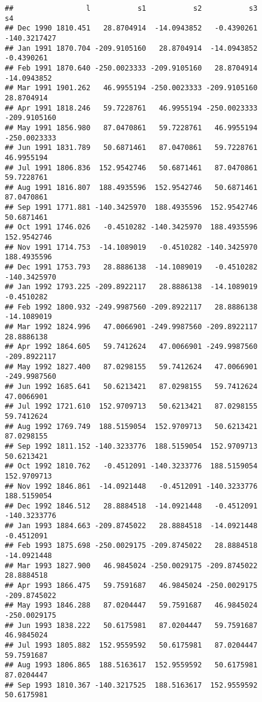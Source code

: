 \documentclass[]{article}
\begin{document}
\begin{verbatim}
##                 l           s1           s2           s3           s4
## Dec 1990 1810.451   28.8704914  -14.0943852   -0.4390261 -140.3217427
## Jan 1991 1870.704 -209.9105160   28.8704914  -14.0943852   -0.4390261
## Feb 1991 1870.640 -250.0023333 -209.9105160   28.8704914  -14.0943852
## Mar 1991 1901.262   46.9955194 -250.0023333 -209.9105160   28.8704914
## Apr 1991 1818.246   59.7228761   46.9955194 -250.0023333 -209.9105160
## May 1991 1856.980   87.0470861   59.7228761   46.9955194 -250.0023333
## Jun 1991 1831.789   50.6871461   87.0470861   59.7228761   46.9955194
## Jul 1991 1806.836  152.9542746   50.6871461   87.0470861   59.7228761
## Aug 1991 1816.807  188.4935596  152.9542746   50.6871461   87.0470861
## Sep 1991 1771.881 -140.3425970  188.4935596  152.9542746   50.6871461
## Oct 1991 1746.026   -0.4510282 -140.3425970  188.4935596  152.9542746
## Nov 1991 1714.753  -14.1089019   -0.4510282 -140.3425970  188.4935596
## Dec 1991 1753.793   28.8886138  -14.1089019   -0.4510282 -140.3425970
## Jan 1992 1793.225 -209.8922117   28.8886138  -14.1089019   -0.4510282
## Feb 1992 1800.932 -249.9987560 -209.8922117   28.8886138  -14.1089019
## Mar 1992 1824.996   47.0066901 -249.9987560 -209.8922117   28.8886138
## Apr 1992 1864.605   59.7412624   47.0066901 -249.9987560 -209.8922117
## May 1992 1827.400   87.0298155   59.7412624   47.0066901 -249.9987560
## Jun 1992 1685.641   50.6213421   87.0298155   59.7412624   47.0066901
## Jul 1992 1721.610  152.9709713   50.6213421   87.0298155   59.7412624
## Aug 1992 1769.749  188.5159054  152.9709713   50.6213421   87.0298155
## Sep 1992 1811.152 -140.3233776  188.5159054  152.9709713   50.6213421
## Oct 1992 1810.762   -0.4512091 -140.3233776  188.5159054  152.9709713
## Nov 1992 1846.861  -14.0921448   -0.4512091 -140.3233776  188.5159054
## Dec 1992 1846.512   28.8884518  -14.0921448   -0.4512091 -140.3233776
## Jan 1993 1884.663 -209.8745022   28.8884518  -14.0921448   -0.4512091
## Feb 1993 1875.698 -250.0029175 -209.8745022   28.8884518  -14.0921448
## Mar 1993 1827.900   46.9845024 -250.0029175 -209.8745022   28.8884518
## Apr 1993 1866.475   59.7591687   46.9845024 -250.0029175 -209.8745022
## May 1993 1846.288   87.0204447   59.7591687   46.9845024 -250.0029175
## Jun 1993 1838.222   50.6175981   87.0204447   59.7591687   46.9845024
## Jul 1993 1805.882  152.9559592   50.6175981   87.0204447   59.7591687
## Aug 1993 1806.865  188.5163617  152.9559592   50.6175981   87.0204447
## Sep 1993 1810.367 -140.3217525  188.5163617  152.9559592   50.6175981

\end{verbatim}
\end{document}

